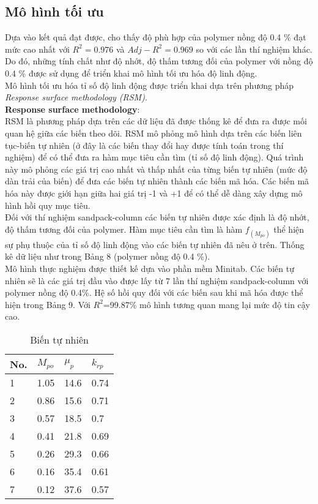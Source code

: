 \documentclass[12pt,a4paper]{article}
\begin{document}
	\subsection{Mô hình tối ưu}
	Dựa vào kết quả đạt được, cho thấy độ phù hợp của polymer nồng độ 0.4 \% đạt mức cao nhất với $R^2=0.976$ và $Adj-R^2=0.969$ so với các lần thí nghiệm khác. Do đó, những tính chất như độ nhớt, độ thấm tương đối của polymer với nồng độ 0.4 \% được sử dụng để triển khai mô hình tối ưu hóa độ linh động.\\
	Mô hình tối ưu hóa tỉ số độ linh động được triển khai dựa trên phương pháp \\\textit{Response surface methodology (RSM)}.\\
	\textbf{Response surface methodology}:\\
	RSM là phương pháp dựa trên các dữ liệu đã được thống kê để đưa ra được mối quan hệ giữa các biến theo dõi. RSM mô phỏng mô hình dựa trên các biến liên tục-biến tự nhiên (ở đây là các biến thay đổi hay được tính toán trong thí nghiệm) để có thể đưa ra hàm mục tiêu cần tìm \cite{leijen2011response} (tỉ số độ linh động). Quá trình này mô phỏng các giá trị cao nhất và thấp nhất của từng biến tự nhiên (mức độ dàn trải của biến) để đưa các biến tự nhiên thành các biến mã hóa. Các biến mã hóa này được giới hạn giữa hai giá trị -1 và +1 để có thể dễ dàng xây dựng mô hình hồi quy mục tiêu.\\
	Đối với thí nghiệm sandpack-column các biến tự nhiên được xác định là độ nhớt, độ thấm tương đối của polymer. Hàm mục tiêu cần tìm là hàm $f_{(M_{po})}$ thể hiện sự phụ thuộc của tỉ số độ linh động vào các biến tự nhiên đã nêu ở trên. Thống kê dữ liệu như trong Bảng 8 (polymer nồng độ 0.4 \%).\\
	Mô hình thực nghiệm được thiết kế dựa vào phần mềm Minitab. Các biến tự nhiên sẽ là các giá trị đầu vào được lấy từ 7 lần thí nghiệm sandpack-column với polymer nồng độ 0.4\%. Hệ số hồi quy đối với các biến sau khi mã hóa được thể hiện trong Bảng 9. Với $R^2$=99.87\% mô hình tương quan mang lại mức độ tin cậy cao.
\begin{table}[h]
\centering
\caption{Biến tự nhiên}
\label{my-label}
\begin{tabularx}{\textwidth}{@{}XXXX@{}}
\toprule
No. & $M_{po}$ & $\mu_p$ & $k_{rp}$ \\ \midrule
1   & 1.05     & 14.6    & 0.74     \\
2   & 0.86     & 15.6    & 0.71     \\
3   & 0.57     & 18.5    & 0.7      \\
4   & 0.41     & 21.8    & 0.69     \\
5   & 0.26     & 29.3    & 0.66     \\
6   & 0.16     & 35.4    & 0.61     \\
7   & 0.12     & 37.6    & 0.57     \\ \bottomrule
\end{tabularx}
\end{table}
\end{document}
